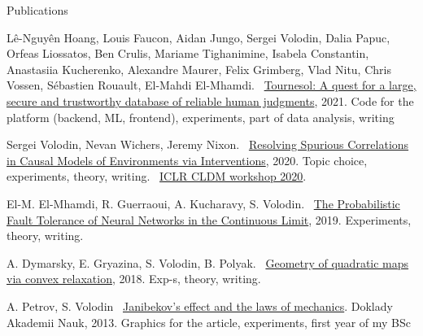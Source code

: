 \documentclass{resume} %
\newcommand*{\mybold}[1]{{\color{pinkunderline} #1}}
\newcommand*{\logo}[1]{%
	\raisebox{-.02\baselineskip}{%
		\texttt{[image: ./img/\\imgpref\#1]}%
	}%
}
\def\imgpref{bleak-}
\newcommand{\mylink}{{\color{gray}\faExternalLink}}
\begin{document}
\vspace{-1em}
\begin{rSection}{Publications}
\vspace{-1em}
\item L\^{e}-Nguy\^{e}n Hoang, Louis Faucon, Aidan Jungo, \mybold{Sergei Volodin,} Dalia Papuc, Orfeas Liossatos, Ben Crulis, Mariame Tighanimine, Isabela Constantin, Anastasiia Kucherenko, Alexandre Maurer, Felix Grimberg, Vlad Nitu, Chris Vossen, Sébastien Rouault, El-Mahdi El-Mhamdi. \mylink~\href{https://arxiv.org/abs/2107.07334}{Tournesol: A quest for a large, secure and trustworthy database of reliable human judgments}, 2021. Code for the platform (backend, ML, frontend), experiments, part of data analysis, writing
\item \logo{iclr.png} \mybold{Sergei Volodin,} Nevan Wichers, Jeremy Nixon. \mylink~\href{https://arxiv.org/abs/2002.05217}{Resolving Spurious Correlations in Causal Models of Environments via Interventions}, 2020. Topic choice, experiments, theory, writing. \mylink~\href{https://causalrlworkshop.github.io/program/cldm_8.html}{ICLR CLDM workshop 2020}.
\item El-M. El-Mhamdi, R. Guerraoui, A. Kucharavy, \mybold{S. Volodin.} \mylink~\href{https://arxiv.org/abs/1902.01686}{The Probabilistic Fault Tolerance of Neural Networks in the Continuous Limit}, 2019. Experiments, theory,  writing. %
\item A. Dymarsky, E. Gryazina, \mybold{S. Volodin}, B. Polyak. \mylink~\href{https://arxiv.org/abs/1810.00896}{Geometry of quadratic maps via convex relaxation}, 2018. Exp-s, theory, writing.%
\item A. Petrov, \mybold{S. Volodin} \mylink~\href{https://sergia-ch.github.io/other-projects/dj/PHDK349.pdf}{Janibekov's effect and the laws of mechanics}. Doklady Akademii Nauk, 2013. Graphics for the article, experiments, first year of my BSc
\end{rSection}
\end{document}
